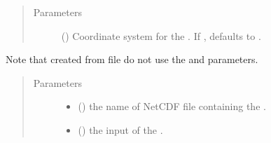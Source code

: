 \documentclass[letterpaper,10pt,english]{sphinxmanual}
\begin{document}
\begin{fulllineitems}
\begin{quote}
\begin{description}
\begin{itemize}
\end{itemize}

\end{description}\end{quote}

\begin{quote}\begin{description}
\item[{Parameters}] \leavevmode
{} ({\hyperref[\detokenize{CoordSys:ESMF.api.constants.CoordSys}]{}}) \textendash{} Coordinate system for the
{\hyperref[\detokenize{mesh:ESMF.api.mesh.Mesh}]{}}.
If , defaults to {\hyperref[\detokenize{CoordSys:ESMF.api.constants.CoordSys.SPH_DEG}]{}}.

\end{description}\end{quote}


Note that {\hyperref[\detokenize{mesh:ESMF.api.mesh.Mesh}]{}} created from file do not use the  and
 parameters.

\begin{quote}\begin{description}
\item[{Parameters}] \leavevmode\begin{itemize}
\item {} 
 () \textendash{} the name of NetCDF file containing the {\hyperref[\detokenize{mesh:ESMF.api.mesh.Mesh}]{}}.

\item {} 
 ({\hyperref[\detokenize{FileFormat:ESMF.api.constants.FileFormat}]{}}) \textendash{} the input
{\hyperref[\detokenize{FileFormat:ESMF.api.constants.FileFormat}]{}} of the {\hyperref[\detokenize{mesh:ESMF.api.mesh.Mesh}]{}}.


\end{itemize}
\end{description}
\end{quote}
\end{fulllineitems}
\end{document}
